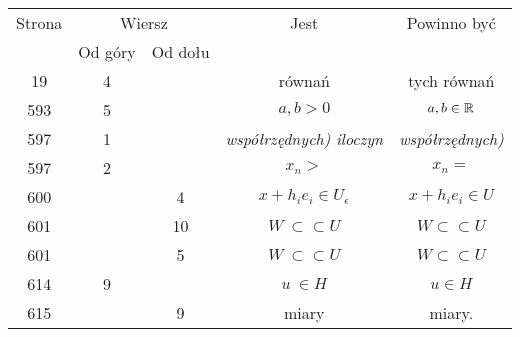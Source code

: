 \documentclass[a4paper,11pt]{article}
\begin{document}
\begin{center}

  \begin{tabular}{|c|c|c|c|c|}
    \hline
    Strona & \multicolumn{2}{c|}{Wiersz} & Jest
                              & Powinno być \\ \cline{2-3}
    & Od góry & Od dołu & & \\
    \hline
    19  &  4 & & równań & tych równań \\
    593 &  5 & & $a, b > 0$ & $a, b \in \mathbb{R}$ \\
    597 &  1 & & \textit{współrzędnych) iloczyn}
           & \textit{współrzędnych)} \\
    597 &  2 & & $x_{ n } >$ & $x_{ n } =$ \\
    600 & & 4 & $x + h_{ i } e_{ i } \in U_{ \epsilon }$
           & $x + h_{ i } e_{ i } \in U$ \\
    601 & & 10 & $W \: \subset \subset U$ & $W \subset \subset U$ \\
    601 & &  5 & $W \: \subset \subset U$ & $W \subset \subset U$ \\
    614 &  9 & & $u \: \in H$ & $u \in H$\\
    615 & &  9 & miary & miary. \\
    \hline
  \end{tabular}

\end{center}

\vspace{\spaceTwo}



















\newpage

\end{document}
